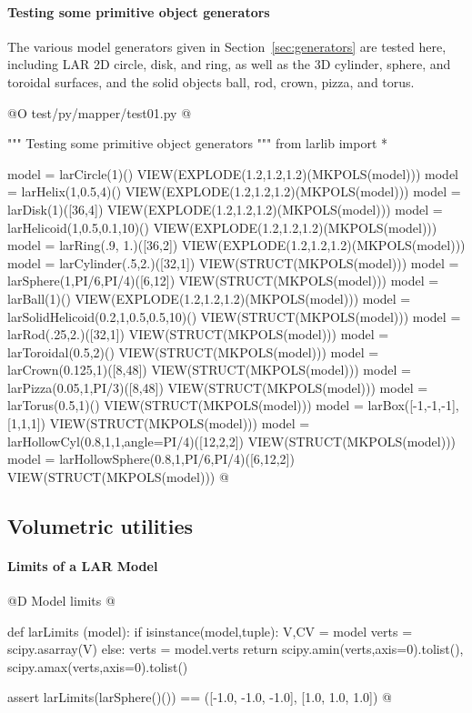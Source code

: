 \documentclass[11pt,oneside]{article}	%
\begin{document}
\paragraph{Testing some primitive object generators}
The various model generators given in Section~\ref{sec:generators} are tested here, including LAR 2D circle, disk, and ring, as well as the 3D cylinder, sphere, and toroidal surfaces, and the solid objects ball, rod, crown, pizza, and torus.

@O test/py/mapper/test01.py
@{""" Testing some primitive object generators """
from larlib import *

model = larCircle(1)()
VIEW(EXPLODE(1.2,1.2,1.2)(MKPOLS(model)))
model = larHelix(1,0.5,4)()
VIEW(EXPLODE(1.2,1.2,1.2)(MKPOLS(model)))
model = larDisk(1)([36,4])
VIEW(EXPLODE(1.2,1.2,1.2)(MKPOLS(model)))
model = larHelicoid(1,0.5,0.1,10)()
VIEW(EXPLODE(1.2,1.2,1.2)(MKPOLS(model)))
model = larRing(.9, 1.)([36,2])
VIEW(EXPLODE(1.2,1.2,1.2)(MKPOLS(model)))
model = larCylinder(.5,2.)([32,1])
VIEW(STRUCT(MKPOLS(model)))
model = larSphere(1,PI/6,PI/4)([6,12])
VIEW(STRUCT(MKPOLS(model)))
model = larBall(1)()
VIEW(EXPLODE(1.2,1.2,1.2)(MKPOLS(model)))
model = larSolidHelicoid(0.2,1,0.5,0.5,10)()
VIEW(STRUCT(MKPOLS(model)))
model = larRod(.25,2.)([32,1])
VIEW(STRUCT(MKPOLS(model)))
model = larToroidal(0.5,2)()
VIEW(STRUCT(MKPOLS(model)))
model = larCrown(0.125,1)([8,48])
VIEW(STRUCT(MKPOLS(model)))
model = larPizza(0.05,1,PI/3)([8,48])
VIEW(STRUCT(MKPOLS(model)))
model = larTorus(0.5,1)()
VIEW(STRUCT(MKPOLS(model)))
model = larBox([-1,-1,-1],[1,1,1])
VIEW(STRUCT(MKPOLS(model)))
model = larHollowCyl(0.8,1,1,angle=PI/4)([12,2,2])
VIEW(STRUCT(MKPOLS(model)))
model = larHollowSphere(0.8,1,PI/6,PI/4)([6,12,2])
VIEW(STRUCT(MKPOLS(model)))
@}


\subsection{Volumetric utilities}


\paragraph{Limits of a LAR Model}
@D Model limits
@{def larLimits (model):
	if isinstance(model,tuple): 
		V,CV = model
		verts = scipy.asarray(V)
	else: verts = model.verts
	return scipy.amin(verts,axis=0).tolist(), scipy.amax(verts,axis=0).tolist()
	
assert larLimits(larSphere()()) == ([-1.0, -1.0, -1.0], [1.0, 1.0, 1.0])
@}
\end{document}
